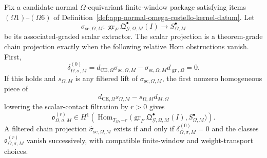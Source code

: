 \begin{thm}
\label{thm:app-equivariant-brane-defect-qme-criterion}
  Fix a candidate normal \(\Omega\)-equivariant finite-window package
  satisfying items \((\Omega1)\)--\((\Omega6)\) of
  Definition~\ref{def:app-normal-omega-costello-kernel-datum}.  Let
  \[
    \sigma_{\mathrm{sc},\Omega,M}\colon
    \operatorname{gr}_{F}\mathfrak Q^\bullet_{\mathcal G,\Omega,M}(I)
    \longrightarrow
    S^\bullet_{\Omega,M}
  \]
  be its associated-graded scalar extractor.  The scalar projection is a
  theorem-grade chain projection exactly when the following relative Hom
  obstructions vanish.  First,
  \[
    \delta^{(0)}_{\Omega,\sigma,M}
      =
    d_{\mathrm{CE},\Omega}\sigma_{\mathrm{sc},\Omega,M}
      -
    \sigma_{\mathrm{sc},\Omega,M}d_{\operatorname{gr},\Omega}
      =
    0 .
  \]
  If this holds and \(s_{\Omega,M}\) is any filtered lift of
  \(\sigma_{\mathrm{sc},\Omega,M}\), the first nonzero homogeneous piece
  of
  \[
    d_{\mathrm{CE},\Omega}s_{\Omega,M}
      -
    s_{\Omega,M}d_{M,\Omega}
  \]
  lowering the scalar-contact filtration by \(r>0\) gives
  \[
    \mathfrak o^{(r)}_{\Omega,\sigma,M}
      \in
    H^1\!\left(
      \operatorname{Hom}_{T_\Omega,-r}
      \bigl(
        \operatorname{gr}_{F}
          \mathfrak Q^\bullet_{\mathcal G,\Omega,M}(I),
        S^\bullet_{\Omega,M}
      \bigr)
    \right).
  \]
  A filtered chain projection
  \(\widehat\sigma_{\mathrm{sc},\Omega,M}\) exists if and only if
  \(\delta^{(0)}_{\Omega,\sigma,M}=0\) and the classes
  \(\mathfrak o^{(r)}_{\Omega,\sigma,M}\) vanish successively, with
  compatible finite-window and weight-transport choices.


\end{thm}
